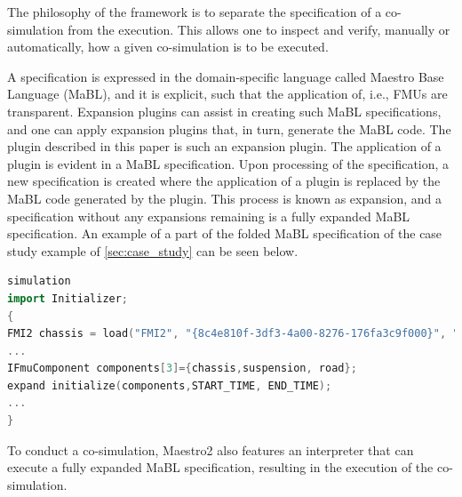 The philosophy of the framework is to separate the specification of a co-simulation from the execution. This allows one to inspect and verify, manually or automatically, how a given co-simulation is to be executed. 

A specification is expressed in the domain-specific language called Maestro Base Language (MaBL), and it is explicit, such that the application of, i.e., FMUs are transparent. Expansion plugins can assist in creating such MaBL specifications, and one can apply expansion plugins that, in turn, generate the MaBL code. The plugin described in this paper is such an expansion plugin. The application of a plugin is evident in a MaBL specification. Upon processing of the specification, a new specification is created where the application of a plugin is replaced by the MaBL code generated by the plugin. This process is known as expansion, and a specification without any expansions remaining is a fully expanded MaBL specification. An example of a part of the folded MaBL specification of the case study example of \cref{sec:case_study} can be seen below.

\begin{lstlisting}[language=C++]
simulation
import Initializer;
{
FMI2 chassis = load("FMI2", "{8c4e810f-3df3-4a00-8276-176fa3c9f000}", "src/chassis-c.fmu");
...
IFmuComponent components[3]={chassis,suspension, road};
expand initialize(components,START_TIME, END_TIME);
...
}
\end{lstlisting}
To conduct a co-simulation, Maestro2 also features an interpreter that can execute a fully expanded MaBL specification, resulting in the execution of the co-simulation.